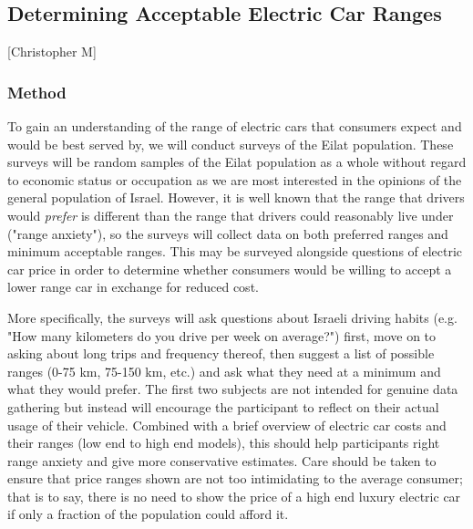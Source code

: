 \documentclass{article}                         %
\begin{document}
\subsection{Determining Acceptable Electric Car Ranges}[Christopher M]
\subsubsection{Method}
To gain an understanding of the range of electric cars that consumers expect and would be best served by, we will conduct surveys of the Eilat population. These surveys will be random samples of the Eilat population as a whole without regard to economic status or occupation as we are most interested in the opinions of the general population of Israel. However, it is well known that the range that drivers would \textit{prefer} is different than the range that drivers could reasonably live under ("range anxiety"), so the surveys will collect data on both preferred ranges and minimum acceptable ranges. This may be surveyed alongside questions of electric car price in order to determine whether consumers would be willing to accept a lower range car in exchange for reduced cost.

More specifically, the surveys will ask questions about Israeli driving habits (e.g. "How many kilometers do you drive per week on average?") first, move on to asking about long trips and frequency thereof, then suggest a list of possible ranges (0-75 km, 75-150 km, etc.) and ask what they need at a minimum and what they would prefer. The first two subjects are not intended for genuine data gathering but instead will encourage the participant to reflect on their actual usage of their vehicle. Combined with a brief overview of electric car costs and their ranges (low end to high end models), this should help participants right range anxiety and give more conservative estimates. Care should be taken to ensure that price ranges shown are not too intimidating to the average consumer; that is to say, there is no need to show the price of a high end luxury electric car if only a fraction of the population could afford it.
\end{document}
